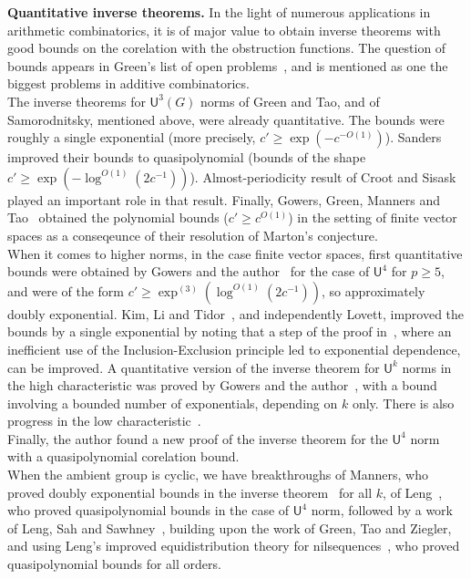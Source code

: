 \documentclass[a4paper,11pt]{article}
\numberwithin{theorem}{section}
\theoremstyle{definition}
\begin{document}
\noindent\textbf{Quantitative inverse theorems.} In the light of numerous applications in arithmetic combinatorics, it is of major value to obtain inverse theorems with good bounds on the corelation with the obstruction functions. The question of bounds appears in Green's list of open problems~\cite{Green100}, and is mentioned as one the biggest problems in additive combinatorics.\\
\indent The inverse theorems for $\mathsf{U}^3(G)$ norms of Green and Tao, and of Samorodnitsky, mentioned above, were already quantitative. The bounds were roughly a single exponential (more precisely, $c' \geq \exp(-c^{-O(1)})$). Sanders~\cite{Sanders} improved their bounds to quasipolynomial (bounds of the shape $c' \geq \exp(-\log^{O(1)}(2c^{-1}))$). Almost-periodicity result of Croot and Sisask~\cite{CrootSisaskPaper} played an important role in that result. Finally, Gowers, Green, Manners and Tao~\cite{Marton1, Marton2} obtained the polynomial bounds ($c' \geq c^{O(1)}$) in the setting of finite vector spaces as a conseqeunce of their resolution of Marton's conjecture.\\
\indent When it comes to higher norms, in the case finite vector spaces, first quantitative bounds were obtained by Gowers and the author~\cite{U4paper} for the case of $\mathsf{U}^4$ for $p \geq 5$, and were of the form $c' \geq \exp^{(3)}(\log^{O(1)}(2c^{-1}))$, so approximately doubly exponential. Kim, Li and Tidor~\cite{KimLiTidor}, and independently Lovett, improved the bounds by a single exponential by noting that a step of the proof in~\cite{U4paper}, where an inefficient use of the Inclusion-Exclusion principle led to exponential dependence, can be improved. A quantitative version of the inverse theorem for $\mathsf{U}^k$ norms in the high characteristic was proved by Gowers and the author~\cite{FMulti}, with a bound involving a bounded number of exponentials, depending on $k$ only. There is also progress in the low characteristic~\cite{LukaU56, Tidor}.\\
\indent Finally, the author found a new proof of the inverse theorem for the $\mathsf{U}^4$ norm with a quasipolynomial corelation bound.\\
\indent When the ambient group is cyclic, we have breakthroughs of Manners, who proved doubly exponential bounds in the inverse theorem~\cite{MannersUk} for all $k$, of Leng~\cite{LengNil2}, who proved quasipolynomial bounds in the case of $\mathsf{U}^4$ norm, followed by a work of Leng, Sah and Sawhney~\cite{LengSahSawhney}, building upon the work of Green, Tao and Ziegler, and using Leng's improved equidistribution theory for nilsequences~\cite{LengNil1}, who proved quasipolynomial bounds for all orders.\\
\end{document}

